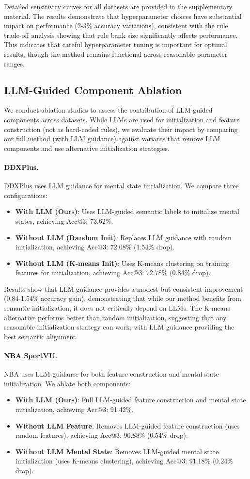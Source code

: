 \documentclass{article} %
\newcommand{\revise}[1]{#1}
\begin{document}
\revise{Detailed sensitivity curves for all datasets are provided in the supplementary material. The results demonstrate that hyperparameter choices have substantial impact on performance (2-3\% accuracy variations), consistent with the rule trade-off analysis showing that rule bank size significantly affects performance. This indicates that careful hyperparameter tuning is important for optimal results, though the method remains functional across reasonable parameter ranges.}
\revise{\subsection{LLM-Guided Component Ablation}
\label{Sec:D4}
We conduct ablation studies to assess the contribution of LLM-guided components across datasets. While LLMs are used for initialization and feature construction (not as hard-coded rules), we evaluate their impact by comparing our full method (with LLM guidance) against variants that remove LLM components and use alternative initialization strategies.}
\revise{\paragraph{DDXPlus.}
DDXPlus uses LLM guidance for mental state initialization. We compare three configurations:
\begin{itemize}
    \item \textbf{With LLM (Ours)}: Uses LLM-guided semantic labels to initialize mental states, achieving Acc@3: 73.62\%.
    \item \textbf{Without LLM (Random Init)}: Replaces LLM guidance with random initialization, achieving Acc@3: 72.08\% (1.54\% drop).
    \item \textbf{Without LLM (K-means Init)}: Uses K-means clustering on training features for initialization, achieving Acc@3: 72.78\% (0.84\% drop).
\end{itemize}}
\revise{Results show that LLM guidance provides a modest but consistent improvement (0.84-1.54\% accuracy gain), demonstrating that while our method benefits from semantic initialization, it does not critically depend on LLMs. The K-means alternative performs better than random initialization, suggesting that any reasonable initialization strategy can work, with LLM guidance providing the best semantic alignment.}
\revise{\paragraph{NBA SportVU.}
NBA uses LLM guidance for both feature construction and mental state initialization. We ablate both components:
\begin{itemize}
    \item \textbf{With LLM (Ours)}: Full LLM-guided feature construction and mental state initialization, achieving Acc@3: 91.42\%.
    \item \textbf{Without LLM Feature}: Removes LLM-guided feature construction (uses random features), achieving Acc@3: 90.88\% (0.54\% drop).
    \item \textbf{Without LLM Mental State}: Removes LLM-guided mental state initialization (uses K-means clustering), achieving Acc@3: 91.18\% (0.24\% drop).
\end{itemize}}
\end{document}
